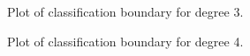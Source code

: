 \documentclass{article}
\begin{document}
\begin{itemize}
  \begin{figure}[H]
 \caption{Plot of classification boundary for degree 3.}
 \label{fig:10}
 \end{figure}
 
  \begin{figure}[H]
 \caption{Plot of classification boundary for degree 4.}
 \label{fig:11}
 \end{figure}
 

\end{itemize}
\end{document}
